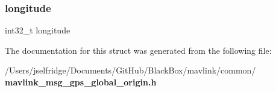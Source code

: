 \mbox{\label{struct____mavlink__gps__global__origin__t_affaa89c8c5bcaf3f03054d63bb6629b1}} 
\subsubsection{longitude}
{\footnotesize\ttfamily int32\+\_\+t longitude}



The documentation for this struct was generated from the following file\+:\begin{DoxyCompactItemize}
\item 
/\+Users/jselfridge/\+Documents/\+Git\+Hub/\+Black\+Box/mavlink/common/\textbf{ mavlink\+\_\+msg\+\_\+gps\+\_\+global\+\_\+origin.\+h}\end{DoxyCompactItemize}
